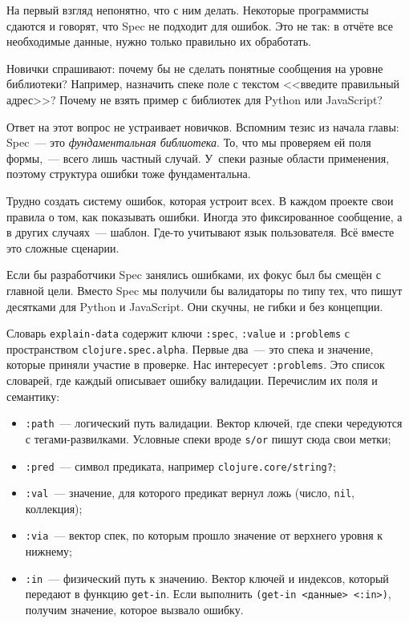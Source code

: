 
На первый взгляд непонятно, что с ним делать. Некоторые программисты сдаются и
говорят, что Spec не подходит для ошибок. Это не так: в отчёте все
необходимые данные, нужно только правильно их обработать.

Новички спрашивают: почему бы не сделать понятные сообщения на уровне
библиотеки? Например, назначить спеке поле с текстом <<введите правильный
адрес>>? Почему не взять пример с библиотек для Python или JavaScript?


Ответ на этот вопрос не устраивает новичков. Вспомним тезис из начала главы:
Spec~--- это \emph{фундаментальная библиотека}. То, что мы проверяем ей поля
формы,~--- всего лишь частный случай. У~спеки разные области применения, поэтому
структура ошибки тоже фундаментальна.

Трудно создать систему ошибок, которая устроит всех. В каждом проекте свои
правила о том, как показывать ошибки. Иногда это фиксированное сообщение, а в
других случаях~--- шаблон. Где-то учитывают язык пользователя. Всё вместе это
сложные сценарии.

Если бы разработчики Spec занялись ошибками, их фокус был бы смещён с главной
цели. Вместо Spec мы получили бы валидаторы по типу тех, что пишут десятками для
Python и JavaScript. Они скучны, не гибки и без концепции.

Словарь \verb|explain-data| содержит ключи \verb|:spec|, \verb|:value| и
\verb|:problems| с пространством \verb|clojure.spec.alpha|. Первые два~--- это
спека и значение, которые приняли участие в проверке. Нас интересует
\verb|:problems|. Это список словарей, где каждый описывает ошибку
валидации. Перечислим их поля и семантику:


\begin{itemize}

\item
  \verb|:path|~--- логический путь валидации. Вектор ключей, где спеки
  чередуются с тегами-развилками. Условные спеки вроде \verb|s/or| пишут сюда
  свои метки;

\item
  \verb|:pred|~--- символ предиката, например \verb|clojure.core/string?|;

\item
  \verb|:val|~--- значение, для которого предикат вернул ложь (число,
  \verb|nil|, коллекция);

\item
  \verb|:via|~--- вектор спек, по которым прошло значение от верхнего уровня к
  нижнему;

\item
  \verb|:in|~--- физический путь к значению. Вектор ключей и индексов, который
  передают в функцию \verb|get-in|. Если выполнить \verb|(get-in <данные> <:in>)|,
  получим значение, которое вызвало ошибку.

\end{itemize}


